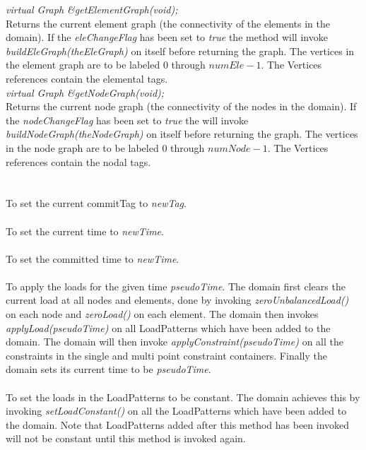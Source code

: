 {\em virtual Graph \&getElementGraph(void);} \\
Returns the current element graph (the connectivity of the elements
in the domain). If the {\em eleChangeFlag} has been set
to {\em true} the method will invoke {\em buildEleGraph(theEleGraph)}
on itself before returning the graph. The vertices in the element
graph are to be labeled $0$ through $numEle-1$. The Vertices references
contain the elemental tags. \\ 

{\em virtual Graph \&getNodeGraph(void);} \\
Returns the current node graph (the connectivity of the nodes in
the domain). If the {\em nodeChangeFlag} has been set to {\em true} the
will invoke {\em buildNodeGraph(theNodeGraph)} on itself before
returning the graph. The vertices in the node graph are to be labeled
$0$ through $numNode-1$. The Vertices references contain the nodal tags. \\ 


  \\
 \\
To set the current commitTag to {\em newTag}. \\

 \\
To set the current time to {\em newTime}. \\

 \\
To set the committed time to {\em newTime}. \\

 \\ 
To apply the loads for the given time {\em pseudoTime}. The domain
first clears the current load at all nodes and elements, done by
invoking {\em zeroUnbalancedLoad()} on each node and {\em zeroLoad()}
on each element. The domain then invokes {\em applyLoad(pseudoTime)}
on all LoadPatterns which have been added to the domain. The domain
will then invoke {\em applyConstraint(pseudoTime)} on all the
constraints in the single and multi point constraint
containers. Finally the domain sets its current time to be {\em
pseudoTime}.\\  

 \\
To set the loads in the LoadPatterns to be constant. The domain
achieves this by invoking {\em setLoadConstant()} on all the
LoadPatterns which have been added to the domain. Note that
LoadPatterns added after this method has been invoked will not be
constant until this method is invoked again. \\


